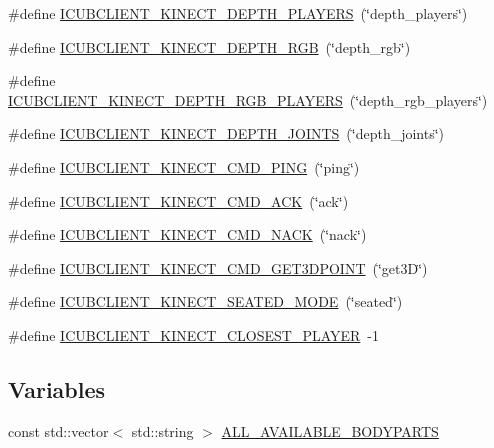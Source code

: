 \begin{DoxyCompactItemize}
\item 
\#define \hyperlink{group__icubclient__tags_ga3052fc2c9ec19fbbd3962015b9b8df8f}{I\+C\+U\+B\+C\+L\+I\+E\+N\+T\+\_\+\+K\+I\+N\+E\+C\+T\+\_\+\+D\+E\+P\+T\+H\+\_\+\+P\+L\+A\+Y\+E\+RS}~(\char`\"{}depth\+\_\+players\char`\"{})
\item 
\#define \hyperlink{group__icubclient__tags_gaabb5ae3edc9bcdaa559eb3899613b757}{I\+C\+U\+B\+C\+L\+I\+E\+N\+T\+\_\+\+K\+I\+N\+E\+C\+T\+\_\+\+D\+E\+P\+T\+H\+\_\+\+R\+GB}~(\char`\"{}depth\+\_\+rgb\char`\"{})
\item 
\#define \hyperlink{group__icubclient__tags_ga2ce048da5392e36f61753b4aa15e240e}{I\+C\+U\+B\+C\+L\+I\+E\+N\+T\+\_\+\+K\+I\+N\+E\+C\+T\+\_\+\+D\+E\+P\+T\+H\+\_\+\+R\+G\+B\+\_\+\+P\+L\+A\+Y\+E\+RS}~(\char`\"{}depth\+\_\+rgb\+\_\+players\char`\"{})
\item 
\#define \hyperlink{group__icubclient__tags_gabdc7ab1db1989f6cba9ab3ed1d65214a}{I\+C\+U\+B\+C\+L\+I\+E\+N\+T\+\_\+\+K\+I\+N\+E\+C\+T\+\_\+\+D\+E\+P\+T\+H\+\_\+\+J\+O\+I\+N\+TS}~(\char`\"{}depth\+\_\+joints\char`\"{})
\item 
\#define \hyperlink{group__icubclient__tags_ga1c782574ba7f774209a05dee8fa5b426}{I\+C\+U\+B\+C\+L\+I\+E\+N\+T\+\_\+\+K\+I\+N\+E\+C\+T\+\_\+\+C\+M\+D\+\_\+\+P\+I\+NG}~(\char`\"{}ping\char`\"{})
\item 
\#define \hyperlink{group__icubclient__tags_ga7a14f32c933b176a1506828b50207bad}{I\+C\+U\+B\+C\+L\+I\+E\+N\+T\+\_\+\+K\+I\+N\+E\+C\+T\+\_\+\+C\+M\+D\+\_\+\+A\+CK}~(\char`\"{}ack\char`\"{})
\item 
\#define \hyperlink{group__icubclient__tags_ga54ea16d687a4e5b1c5f0fe12bf7c0788}{I\+C\+U\+B\+C\+L\+I\+E\+N\+T\+\_\+\+K\+I\+N\+E\+C\+T\+\_\+\+C\+M\+D\+\_\+\+N\+A\+CK}~(\char`\"{}nack\char`\"{})
\item 
\#define \hyperlink{group__icubclient__tags_ga7605bef4c006e2d14c88c488b89a1dab}{I\+C\+U\+B\+C\+L\+I\+E\+N\+T\+\_\+\+K\+I\+N\+E\+C\+T\+\_\+\+C\+M\+D\+\_\+\+G\+E\+T3\+D\+P\+O\+I\+NT}~(\char`\"{}get3D\char`\"{})
\item 
\#define \hyperlink{group__icubclient__tags_ga9d7b9c625ca92dccbb3f9a534ae56493}{I\+C\+U\+B\+C\+L\+I\+E\+N\+T\+\_\+\+K\+I\+N\+E\+C\+T\+\_\+\+S\+E\+A\+T\+E\+D\+\_\+\+M\+O\+DE}~(\char`\"{}seated\char`\"{})
\item 
\#define \hyperlink{group__icubclient__tags_ga5653721b60ca5d51e4a611def631d0a1}{I\+C\+U\+B\+C\+L\+I\+E\+N\+T\+\_\+\+K\+I\+N\+E\+C\+T\+\_\+\+C\+L\+O\+S\+E\+S\+T\+\_\+\+P\+L\+A\+Y\+ER}~-\/1
\end{DoxyCompactItemize}
\subsection*{Variables}
\begin{DoxyCompactItemize}
\item 
const std\+::vector$<$ std\+::string $>$ \hyperlink{group__icubclient__tags_gade192f747940c9efbd7be762d2a97fb8}{A\+L\+L\+\_\+\+A\+V\+A\+I\+L\+A\+B\+L\+E\+\_\+\+B\+O\+D\+Y\+P\+A\+R\+TS}
\end{DoxyCompactItemize}


